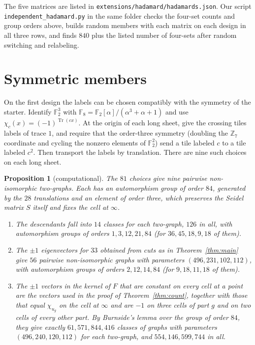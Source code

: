 \documentclass[11pt]{amsart}
\newtheorem{proposition}[theorem]{Proposition}
\theoremstyle{remark}
\newcommand{\F}{\mathbb{F}}
\newcommand{\Z}{\mathbb{Z}}
\begin{document}
\begin{sloppypar}The five matrices are listed in \texttt{extensions/hadamard/hadamards.json}. Our script \texttt{independent\_hadamard.py} in the same folder checks the four-set counts and group orders above, builds random members with each matrix on each design in all three rows, and finds $840$ plus the listed number of four-sets after random switching and relabeling.\end{sloppypar}

\section{Symmetric members}\label{sec:symmetric}

On the first design the labels can be chosen compatibly with the symmetry of the starter. Identify $\F_2^3$ with $\F_8=\F_2[\alpha]/(\alpha^3+\alpha+1)$ and use $\chi_c(x)=(-1)^{\operatorname{Tr}(cx)}$. At the origin of each long sheet, give the crossing tiles labels of trace $1$, and require that the order-three symmetry (doubling the $\Z_7$ coordinate and cycling the nonzero elements of $\F_2^2$) send a tile labeled $c$ to a tile labeled $c^2$. Then transport the labels by translation. There are nine such choices on each long sheet.

\begin{proposition}[computational]\label{prop:symmetric}
The $81$ choices give nine pairwise non-isomorphic two-graphs. Each has an automorphism group of order $84$, generated by the $28$ translations and an element of order three, which preserves the Seidel matrix $S$ itself and fixes the cell at $\infty$.
\begin{enumerate}
\item The descendants fall into $14$ classes for each two-graph, $126$ in all, with automorphism groups of orders $1,3,12,21,84$ (for $36,45,18,9,18$ of them).
\item The $\pm1$ eigenvectors for $33$ obtained from cuts as in Theorem~\ref{thm:main} give $56$ pairwise non-isomorphic graphs with parameters $(496,231,102,112)$, with automorphism groups of orders $2,12,14,84$ (for $9,18,11,18$ of them).
\item The $\pm1$ vectors in the kernel of $F$ that are constant on every cell at a point are the vectors used in the proof of Theorem~\ref{thm:count}, together with those that equal $\chi_{u_g}$ on the cell at $\infty$ and are $-1$ on three cells of part $g$ and on two cells of every other part. By Burnside's lemma over the group of order $84$, they give exactly $61{,}571{,}844{,}416$ classes of graphs with parameters $(496,240,120,112)$ for each two-graph, and $554{,}146{,}599{,}744$ in all.
\end{enumerate}
\end{proposition}
\end{document}
